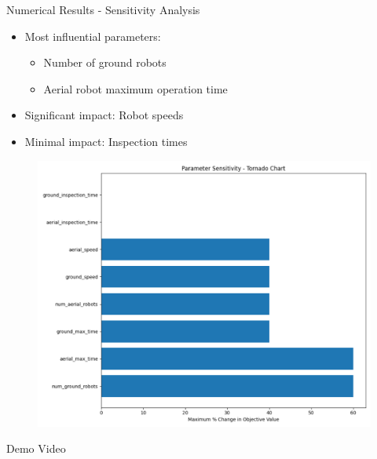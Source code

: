 \documentclass[11pt,xcolor={dvipsnames},hyperref={pdftex,pdfpagemode=UseNone,hidelinks,pdfdisplaydoctitle=true},usepdftitle=false]{beamer}
\begin{document}
    \begin{frame}{Numerical Results - Sensitivity Analysis}
      \begin{itemize}
        \item Most influential parameters:
          \begin{itemize}
            \item Number of ground robots
            \item Aerial robot maximum operation time
          \end{itemize}
        \item Significant impact: Robot speeds
        \item Minimal impact: Inspection times
      \end{itemize}
      
      \begin{figure}
        \centering
        \includegraphics[width=0.5\linewidth]{figures/tornado_chart.pdf}
      \end{figure}
    \end{frame}

    \begin{frame}{Demo Video}
      \centering
      
    \end{frame}
    
    \lastslide
\end{document}
